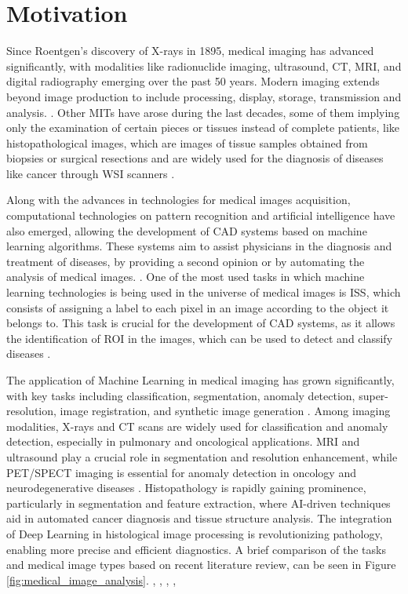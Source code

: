 \section{Motivation}\label{sec:motivation}

Since Roentgen’s discovery of X-rays in 1895, medical imaging has
advanced significantly, with modalities like radionuclide imaging,
ultrasound, CT, MRI, and digital radiography emerging over the past
50 years. Modern imaging extends beyond image production to include
processing, display, storage, transmission and analysis.
\cite{Zhou2021}.
Other \gls{MITs} have arose during the last decades, some of them
implying only the examination of certain pieces or tissues
instead of complete patients, like histopathological images, which
are images of tissue samples obtained from biopsies or surgical
resections and are widely used for the diagnosis of diseases like
cancer through \gls{WSI} scanners \cite{Rashmi2021}.

Along with the advances in technologies for medical images acquisition,
computational technologies on pattern recognition and artificial intelligence
have also emerged, allowing the development of \gls{CAD} systems based on
machine learning algorithms. These systems aim to assist physicians
in the diagnosis and treatment of diseases, by providing a second
opinion or by automating the analysis of medical images.
\cite{Panayides2020}. One of the most used tasks in which machine
learning technologies is being used in the universe of medical images
is \gls{ISS}, which consists of assigning a label to each pixel in an image
according to the object it belongs to. This task is crucial for the development
of \gls{CAD} systems, as it allows the identification of \gls{ROI} in
the images, which can be used to detect and classify diseases
\cite{Azad2024}.

The application of Machine Learning in medical imaging has grown
significantly, with key tasks including classification, segmentation,
anomaly detection, super-resolution, image registration, and
synthetic image generation \cite{Brito-Pacheco2025}. Among imaging
modalities, X-rays and CT scans are widely used for classification
and anomaly detection, especially in pulmonary and oncological
applications. MRI and ultrasound play a crucial role in segmentation
and resolution enhancement, while PET/SPECT imaging is essential for
anomaly detection in oncology and neurodegenerative diseases
\cite{Brito-Pacheco2025}.
Histopathology is rapidly gaining prominence, particularly in segmentation and
feature extraction, where AI-driven techniques aid in automated
cancer diagnosis and tissue structure analysis. The integration of
Deep Learning in histological image processing is revolutionizing
pathology, enabling more precise and efficient diagnostics. A brief
comparison of the tasks and medical image types
based on recent literature review, can be seen in Figure
\ref{fig:medical_image_analysis}. \cite{YuEtAl2025},
\cite{Brito-Pacheco2025}, \cite{RyouEtAl2025},
\cite{DingyiEtAl2025}, \cite{BehnazEtAl2025}

